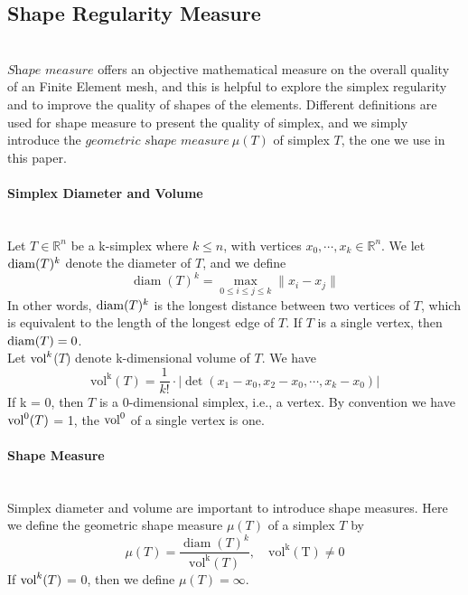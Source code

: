 \subsection{Shape Regularity Measure}\mbox{}\\
    $\textit{Shape measure}$ offers an objective mathematical measure on the overall quality of an Finite Element mesh, and this is helpful to explore the simplex regularity and to improve the quality of shapes of the elements. Different definitions are used for shape measure to present the quality of simplex, and we simply introduce the $\textit{geometric shape measure} ~\mu({T})$ of simplex ${T}$,  the one we use in this paper.

    \paragraph{Simplex Diameter and Volume}\mbox{}\\
    Let ${T} \in\mathbb{R}^n$ be a k-simplex where $k \leqslant n$, with vertices ${x}_0, \cdots, {x}_k \in\mathbb{R}^n$. We let $\operatorname{diam}({T})^k$ denote the diameter of ${T}$, and we define
    \begin{equation*}
    \operatorname{diam}({T})^k = \max_{0\leqslant i\leqslant j\leqslant k} \| x_i - x_j \|
    \end{equation*}
    In other words, $\operatorname{diam}({T})^k$ is the longest distance between two vertices of ${T}$, which is equivalent to the length of the longest edge of ${T}$. If ${T}$ is a single vertex, then $\operatorname{diam}({T}) = 0$.\\

    \noindent
    Let $\operatorname{vol}^k$(${T}$) denote k-dimensional volume of ${T}$. We have
    \begin{equation*}
    \operatorname{vol^k} ({T}) = \frac{1}{k!}\cdot|\det(x_1-x_0, x_2-x_0,\cdots, x_k-x_0)|
    \end{equation*}
    \noindent
    If k = 0, then ${T}$ is a 0-dimensional simplex, i.e., a vertex. By convention we have $\operatorname{vol}^0 ({T})$ = 1, the $\operatorname{vol}^0$ of a single vertex is one.

    
    \paragraph{Shape Measure}\mbox{}\\
    Simplex diameter and volume are important to introduce shape measures. Here we define the {geometric shape measure} $\mu({{T}})$ of a simplex ${T}$ by
    \begin{equation*}
    \mu({{T}}) = \frac{\operatorname{diam}({T})^k}{\operatorname{vol^k}({T})}, \quad\operatorname{vol^k(T) \neq 0}
    \end{equation*}
    If $\operatorname{vol}^k(T)$ = 0, then we define $\mu({{T}}) = \infty$.\\
    
